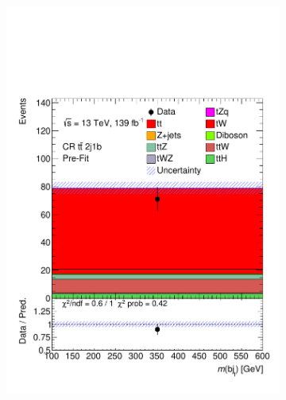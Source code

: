 \begin{figure}[!h]
\begin{subfigure}[b]{0.33\linewidth}
    \includegraphics[width=\textwidth]{ubonn-thesis/Chapters/Chapters_08/appendix/data/CR_2j1b.pdf} 
    \caption{}
  \end{subfigure} 
  \centering
  \begin{subfigure}[b]{0.33\linewidth}

\end{subfigure}
\end{figure}
